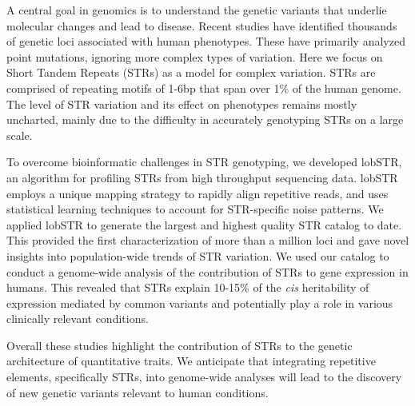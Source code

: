 % 
% 
%

A central goal in genomics is to understand the genetic variants that underlie molecular changes and lead to disease. Recent studies have identified thousands of genetic loci associated with human phenotypes. These have primarily analyzed point mutations, ignoring more complex types of variation. Here we focus on Short Tandem Repeats (STRs) as a model for complex variation. STRs are comprised of repeating motifs of 1-6bp that span over 1\% of the human genome. The level of STR variation and its effect on phenotypes remains mostly uncharted, mainly due to the difficulty in accurately genotyping STRs on a large scale.

To overcome bioinformatic challenges in STR genotyping, we developed lobSTR, an algorithm for profiling STRs from high throughput sequencing data. lobSTR employs a unique mapping strategy to rapidly align repetitive reads, and uses statistical learning techniques to account for STR-specific noise patterns. We applied lobSTR to generate the largest and highest quality STR catalog to date. This provided the first characterization of more than a million loci and gave novel insights into population-wide trends of STR variation. We used our catalog to conduct a genome-wide analysis of the contribution of STRs to gene expression in humans. This revealed that STRs explain 10-15\% of the \emph{cis} heritability of expression mediated by common variants and potentially play a role in various clinically relevant conditions.

Overall these studies highlight the contribution of STRs to the genetic architecture of quantitative traits. We anticipate that integrating repetitive elements, specifically STRs, into genome-wide analyses will lead to the discovery of new genetic variants relevant to human conditions.